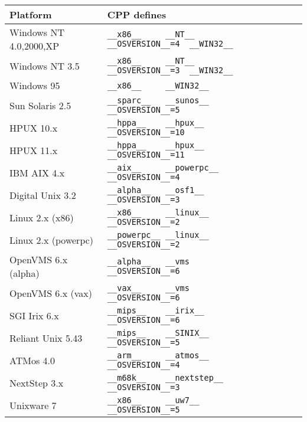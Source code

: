 \documentclass[11pt,twoside,a4paper]{book}
\begin{document}
\begin{flushleft}
\begin{tabular}{|l|l|}
\hline
Platform            & CPP defines \\
\hline
Windows NT 4.0,2000,XP & \verb|__x86__     __NT__       __OSVERSION__=4  __WIN32__| \\

Windows NT 3.5      & \verb|__x86__     __NT__       __OSVERSION__=3  __WIN32__| \\

Windows 95          & \verb|__x86__     __WIN32__| \\

Sun Solaris 2.5     & \verb|__sparc__   __sunos__    __OSVERSION__=5| \\

HPUX 10.x           & \verb|__hppa__    __hpux__     __OSVERSION__=10| \\

HPUX 11.x           & \verb|__hppa__    __hpux__     __OSVERSION__=11| \\

IBM AIX 4.x         & \verb|__aix__     __powerpc__  __OSVERSION__=4| \\

Digital Unix 3.2    & \verb|__alpha__   __osf1__     __OSVERSION__=3| \\

Linux 2.x (x86)     & \verb|__x86__     __linux__    __OSVERSION__=2| \\

Linux 2.x (powerpc) & \verb|__powerpc__ __linux__    __OSVERSION__=2| \\

OpenVMS 6.x (alpha) & \verb|__alpha__   __vms        __OSVERSION__=6 | \\

OpenVMS 6.x (vax)   & \verb|__vax__     __vms        __OSVERSION__=6 | \\

SGI Irix 6.x        & \verb|__mips__    __irix__     __OSVERSION__=6 | \\

Reliant Unix 5.43   & \verb|__mips__    __SINIX__    __OSVERSION__=5 | \\

ATMos 4.0           & \verb|__arm__     __atmos__    __OSVERSION__=4| \\

NextStep 3.x        & \verb|__m68k__    __nextstep__ __OSVERSION__=3| \\

Unixware 7          & \verb|__x86__     __uw7__      __OSVERSION__=5| \\
\hline
\end{tabular}
\end{flushleft}
\end{document}
